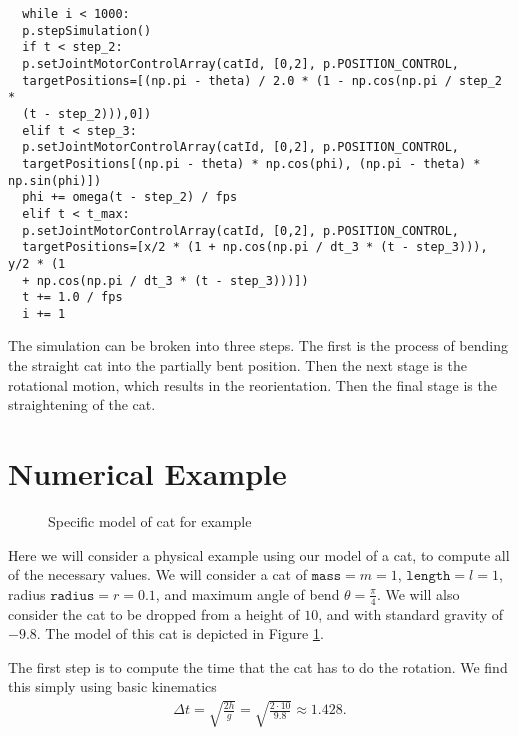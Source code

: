 \documentclass[12]{amsart}
\theoremstyle{definition}
\begin{document}
\begin{verbatim}
  while i < 1000:
  p.stepSimulation()
  if t < step_2:
  p.setJointMotorControlArray(catId, [0,2], p.POSITION_CONTROL,
  targetPositions=[(np.pi - theta) / 2.0 * (1 - np.cos(np.pi / step_2 *
  (t - step_2))),0])
  elif t < step_3:
  p.setJointMotorControlArray(catId, [0,2], p.POSITION_CONTROL,
  targetPositions[(np.pi - theta) * np.cos(phi), (np.pi - theta) * np.sin(phi)])
  phi += omega(t - step_2) / fps
  elif t < t_max:
  p.setJointMotorControlArray(catId, [0,2], p.POSITION_CONTROL,
  targetPositions=[x/2 * (1 + np.cos(np.pi / dt_3 * (t - step_3))), y/2 * (1
  + np.cos(np.pi / dt_3 * (t - step_3)))])
  t += 1.0 / fps
  i += 1
\end{verbatim}
The simulation can be broken into three steps. The first is the process of
bending the straight cat into the partially bent position. Then the next stage
is the rotational motion, which results in the reorientation. Then the final
stage is the straightening of the cat.

\section{Numerical Example}%
\label{sec:numerical_example}

\begin{figure}[htpb]
  \centering
  
  \caption{Specific model of cat for example}%
  \label{fig:example_cat}
\end{figure}

Here we will consider a physical example using our model of a cat, to compute
all of the necessary values. We will consider a cat of $\mathtt{mass}=m=1$,
$\mathtt{length}=l=1$, radius $\mathtt{radius}=r=0.1$, and maximum angle of
bend $\theta=\frac{\pi}{4}$. We will also consider the cat to be dropped from a
height of $10$, and with standard gravity of $-9.8$. The model of this cat is
depicted in Figure \ref{fig:example_cat}.

The first step is to compute the time that the cat has to do the rotation. We
find this simply using basic kinematics
\begin{align*}
  \Delta t = \sqrt{\frac{2h}{g}}=\sqrt{\frac{2\cdot 10}{9.8}}\approx 1.428.
\end{align*}
\end{document}
